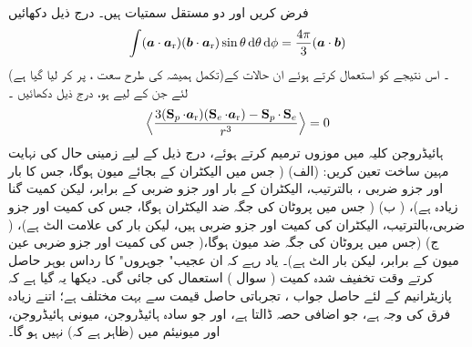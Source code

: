  
فرض کریں  اور  دو مستقل سمتیات ہیں۔  درج ذیل دکھائیں
\begin{align}
 \int(\kvec{a} \cdot \kvec{\kvecsub{a}{r}}) (\kvec{b} \cdot \kvec{\kvecsub{a}{r}}) \sin \theta \dif \theta \dif  \phi = \frac{4 \pi}{3} (\kvec{a} \cdot \kvec{b})
\end{align}
(تکمل ہمیشہ کی طرح سعت  ، پر  کر لیا گیا ہے)۔  اس نتیجے  کو استعمال کرتے ہوئے ان حالات کے لئے جن کے لیے  ہو،  درج ذیل دکھائیں ۔
\begin{align*}
\Big\langle \frac{3 (\operatorname{\mathbf{S}}_p \cdot {\ensuremath{{\boldsymbol{a}}}_{\textup{r}}})(\operatorname{\mathbf{S}}_e \cdot {\ensuremath{{\boldsymbol{a}}}_{\textup{r}}}) - \operatorname{\mathbf{S}}_p \cdot \operatorname{\mathbf{S}}_e}{r^3} \Big \rangle = 0
\end{align*}
   
ہائیڈروجن کلیہ میں موزوں ترمیم کرتے ہوئے،  درج ذیل کے لیے زمینی حال کی  نہایت مہین ساخت تعین کریں: (الف)   (  جس میں  الیکٹران  کے  بجائے میون ہوگا،  جس کا بار اور  جزو ضربی  ، بالترتیب،  الیکٹران کے بار اور  جزو ضربی کے برابر،  لیکن کمیت  گنا زیادہ ہے)،  ( ب)  ( جس میں پروٹان کی جگہ  ضد الیکٹران  ہوگا، جس کی کمیت اور  جزو ضربی،بالترتیب،  الیکٹران کی کمیت اور  جزو ضربی ہیں،  لیکن  بار کی  علامت الٹ ہے)،  ( ج)    (جس میں پروٹان کی جگہ ضد میون ہوگا،(  جس کی کمیت اور  جزو ضربی   عین  میون کے برابر، لیکن بار الٹ ہے)۔   یاد رہے کہ  ان عجیب" جوہروں" کا رداس بوہر حاصل کرتے وقت  تخفیف  شدہ کمیت
( سوال )   استعمال کی جائی  گی۔ دیکھا یہ گیا ہے کہ پازیٹرانیم کے لئے حاصل جواب ،  تجرباتی
 حاصل قیمت  سے بہت مختلف ہے؛  اتنے زیادہ  فرق کی وجہ           ہے،  جو اضافی  حصہ ڈالتا ہے،  اور جو سادہ ہائیڈروجن، میونی ہائیڈروجن،  اور میونیئم  میں (ظاہر ہے کہ)  نہیں ہو گا۔ 


